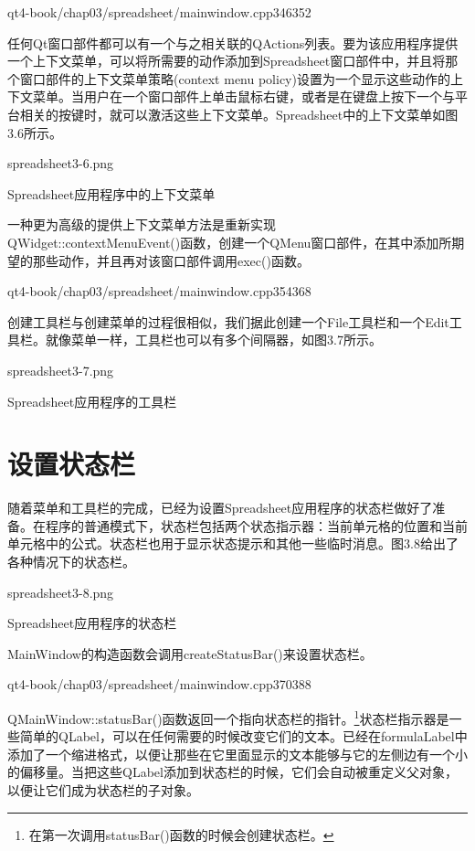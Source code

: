\documentclass[11pt,oneside]{book}
\begin{document}
\begin{common-format}
\begin{cppline}{qt4-book/chap03/spreadsheet/mainwindow.cpp}{346}{352}
\end{cppline}

任何Qt窗口部件都可以有一个与之相关联的QActions列表。要为该应用程序提供一个上下文菜单，可以将所需要的动作添加到Spreadsheet窗口部件中，并且将那个窗口部件的上下文菜单策略(context menu policy)设置为一个显示这些动作的上下文菜单。当用户在一个窗口部件上单击鼠标右键，或者是在键盘上按下一个与平台相关的按键时，就可以激活这些上下文菜单。Spreadsheet中的上下文菜单如图3.6所示。
\begin{fig}[0.6]{spreadsheet3-6.png}
\caption{Spreadsheet应用程序中的上下文菜单}
\label{fig:spreadsheet3-6.png}
\end{fig}

一种更为高级的提供上下文菜单方法是重新实现\\ QWidget::contextMenuEvent()函数，创建一个QMenu窗口部件，在其中添加所期望的那些动作，并且再对该窗口部件调用exec()函数。
\begin{cppline}{qt4-book/chap03/spreadsheet/mainwindow.cpp}{354}{368}
\end{cppline}

创建工具栏与创建菜单的过程很相似，我们据此创建一个File工具栏和一个Edit工具栏。就像菜单一样，工具栏也可以有多个间隔器，如图3.7所示。
\begin{linefig}[0.6]{spreadsheet3-7.png}
\caption{Spreadsheet应用程序的工具栏}
\label{fig:spreadsheet3-7.png}
\end{linefig}


\section{设置状态栏}
随着菜单和工具栏的完成，已经为设置Spreadsheet应用程序的状态栏做好了准备。在程序的普通模式下，状态栏包括两个状态指示器：当前单元格的位置和当前单元格中的公式。状态栏也用于显示状态提示和其他一些临时消息。图3.8给出了各种情况下的状态栏。
\begin{linefig}[0.7]{spreadsheet3-8.png}
\caption{Spreadsheet应用程序的状态栏}
\label{fig:spreadsheet3-8.png}
\end{linefig}

MainWindow的构造函数会调用createStatusBar()来设置状态栏。
\begin{cppline}{qt4-book/chap03/spreadsheet/mainwindow.cpp}{370}{388}
\end{cppline}

QMainWindow::statusBar()函数返回一个指向状态栏的指针。\footnote{在第一次调用statusBar()函数的时候会创建状态栏。}状态栏指示器是一些简单的QLabel，可以在任何需要的时候改变它们的文本。已经在formulaLabel中添加了一个缩进格式，以便让那些在它里面显示的文本能够与它的左侧边有一个小的偏移量。当把这些QLabel添加到状态栏的时候，它们会自动被重定义父对象，以便让它们成为状态栏的子对象。


\end{common-format}
\end{document}
